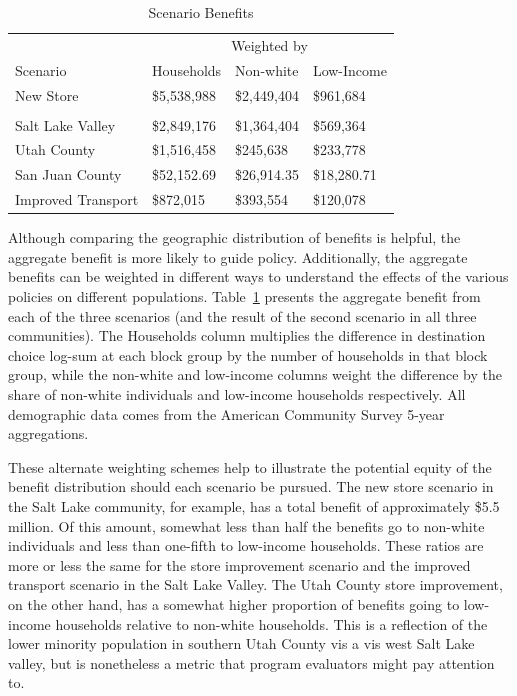 \documentclass[
  letterpaper,
  DIV=11,
  numbers=noendperiod]{scrreport}
\begin{document}
\hypertarget{tbl-scenarios}{}
\begin{table}
\caption{\label{tbl-scenarios}Scenario Benefits }\tabularnewline

\centering
\begin{tabular}[t]{llll}
\toprule
\multicolumn{1}{c}{ } & \multicolumn{3}{c}{Weighted by} \\
\cmidrule(l{3pt}r{3pt}){2-4}
Scenario & Households & Non-white & Low-Income\\
\midrule
New Store & \$5,538,988 & \$2,449,404 & \$961,684\\
\addlinespace[0.3em]
\multicolumn{4}{l}{\textbf{Improved Store}}\\
\hspace{1em}Salt Lake Valley & \$2,849,176 & \$1,364,404 & \$569,364\\
\hspace{1em}Utah County & \$1,516,458 & \$245,638 & \$233,778\\
\hspace{1em}San Juan County & \$52,152.69 & \$26,914.35 & \$18,280.71\\
Improved Transport & \$872,015 & \$393,554 & \$120,078\\
\bottomrule
\end{tabular}
\end{table}

Although comparing the geographic distribution of benefits is helpful,
the aggregate benefit is more likely to guide policy. Additionally, the
aggregate benefits can be weighted in different ways to understand the
effects of the various policies on different populations.
Table~\ref{tbl-scenarios} presents the aggregate benefit from each of
the three scenarios (and the result of the second scenario in all three
communities). The Households column multiplies the difference in
destination choice log-sum at each block group by the number of
households in that block group, while the non-white and low-income
columns weight the difference by the share of non-white individuals and
low-income households respectively. All demographic data comes from the
American Community Survey 5-year aggregations.

These alternate weighting schemes help to illustrate the potential
equity of the benefit distribution should each scenario be pursued. The
new store scenario in the Salt Lake community, for example, has a total
benefit of approximately \$5.5 million. Of this amount, somewhat less
than half the benefits go to non-white individuals and less than
one-fifth to low-income households. These ratios are more or less the
same for the store improvement scenario and the improved transport
scenario in the Salt Lake Valley. The Utah County store improvement, on
the other hand, has a somewhat higher proportion of benefits going to
low-income households relative to non-white households. This is a
reflection of the lower minority population in southern Utah County vis
a vis west Salt Lake valley, but is nonetheless a metric that program
evaluators might pay attention to.
\end{document}
